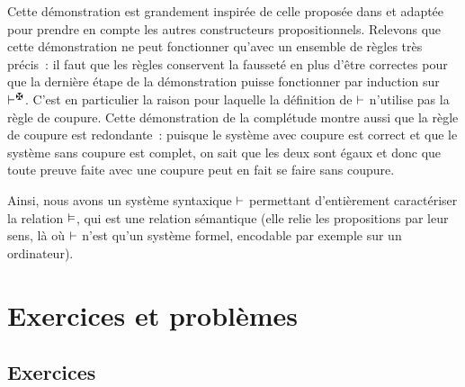 \begin{remark}
  Cette démonstration est grandement inspirée de celle proposée dans
  \cite{BelghitiMansuyVie2016} et adaptée pour prendre en compte les autres
  constructeurs propositionnels. Relevons que cette démonstration ne peut
  fonctionner qu'avec un ensemble de règles très précis~: il faut que les règles
  conservent la fausseté en plus d'être correctes pour que la dernière étape de
  la démonstration puisse fonctionner par induction sur $\vdAbs$.
  C'est en particulier la raison pour laquelle la définition
  de $\vdash$ n'utilise pas la règle de coupure. Cette démonstration de la
  complétude montre aussi que la règle de coupure est redondante~: puisque
  le système avec coupure est correct et que le système sans coupure est
  complet, on sait que les deux sont égaux et donc que toute preuve faite avec
  une coupure peut en fait se faire sans coupure.
\end{remark}

Ainsi, nous avons un système syntaxique $\vdash$ permettant d'entièrement
caractériser la relation $\vDash$, qui est une relation sémantique (elle relie
les propositions par leur sens, là où $\vdash$ n'est qu'un système formel,
encodable par exemple sur un ordinateur).

\clearpage

\section{Exercices et problèmes}

\subsection{Exercices}

